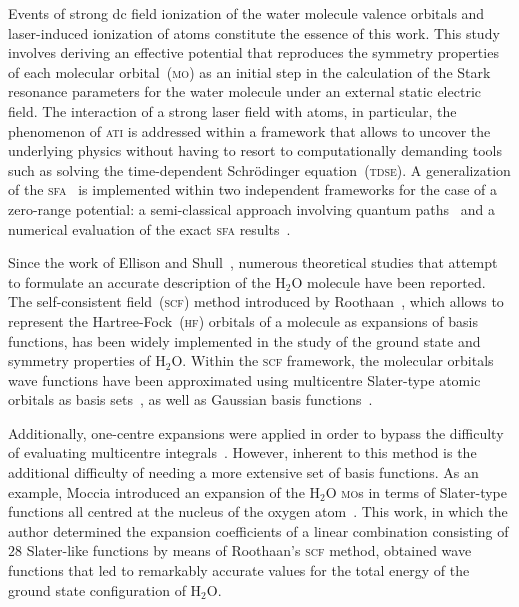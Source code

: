 Events of strong dc field ionization of the water molecule valence
orbitals and laser-induced ionization of atoms constitute the essence
of this work. This study involves deriving an effective potential that
reproduces the symmetry properties of each molecular
orbital~(\textsc{mo}) as an initial step in the calculation of the
Stark resonance parameters for the water molecule under an external
static electric field.
The interaction of a strong laser field with atoms, in particular, the
phenomenon of \textsc{ati} is addressed within a framework that allows
to uncover the underlying physics without having to resort to
computationally demanding tools such as solving the time-dependent
Schr\"{o}dinger equation~(\textsc{tdse}). A generalization of the
\textsc{sfa}~\cite{KeldyshSFA} is implemented within two independent
frameworks for the case of a zero-range potential: a semi-classical
approach involving quantum paths~\cite{KopoldOptComm2000} and a
numerical evaluation of the exact \textsc{sfa}
results~\cite{Kopold_1997sfa}.



Since the work of Ellison and Shull~\cite{EllisonShullh2o_1955},
numerous theoretical studies that attempt to formulate an accurate
description of the H$_{2}$O molecule have been reported. The
self-consistent field~(\textsc{scf}) method introduced by
Roothaan~\cite{Roothaan_1951}, which allows to represent the
Hartree-Fock~(\textsc{hf}) orbitals of a molecule as expansions of
basis functions, has been widely implemented in the study of the
ground state and symmetry properties of H$_{2}$O. Within the
\textsc{scf} framework, the molecular orbitals wave functions have
been approximated using multicentre Slater-type atomic orbitals as
basis
sets~\cite{Reeves_nature_1956,natureH2O_1960,Pitzer_1968,Pitzer_1970},
as well as Gaussian basis
functions~\cite{gaussianH2O_1965,Neumann_gaussian_1968}.

Additionally, one-centre expansions were applied in order to bypass
the difficulty of evaluating multicentre
integrals~\cite{Moccia_1964,oneCentre_1961,Parr_JCP_1960}. However,
inherent to this method is the additional difficulty of needing a more
extensive set of basis functions. As an example, Moccia introduced an
expansion of the H$_{2}$O \textsc{mo}s in terms of Slater-type
functions all centred at the nucleus of the oxygen
atom~\cite{Moccia_1964}. This work, in which the author determined the
expansion coefficients of a linear combination consisting of $28$
Slater-like functions by means of Roothaan's \textsc{scf} method,
obtained wave functions that led to remarkably accurate values for the
total energy of the ground state configuration of H$_{2}$O.

